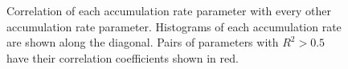 \begin{figure}[ht]
\centering
{}
\caption[]{Correlation of each accumulation rate parameter with every other accumulation rate parameter. Histograms of each accumulation rate are shown along the diagonal. Pairs of parameters with $R^2 > 0.5$ have their correlation coefficients shown in red.}
\label{fig:accumCorrelation}
\end{figure}







